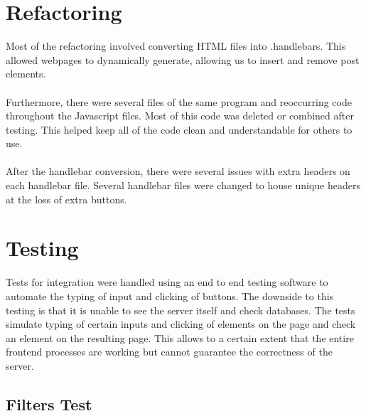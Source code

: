 \documentclass[a4paper]{article}
\begin{document}
\section{Refactoring}
Most of the refactoring involved converting HTML files into .handlebars. This allowed webpages to dynamically generate, allowing us to insert and remove post elements. \\
\\
Furthermore, there were several files of the same program and reoccurring code throughout the Javascript files. Most of this code was deleted or combined after testing. This helped keep all of the code clean and understandable for others to use.\\
\\
After the handlebar conversion, there were several issues with extra headers on each handlebar file. Several handlebar files were changed to house unique headers at the loss of extra buttons. 


\section{Testing}

Tests for integration were handled using an end to end testing software to automate the typing of input and clicking of buttons. 
The downside to this testing is that it is unable to see the server itself and check databases.
The tests simulate typing of certain inputs and clicking of elements on the page and check an element on the resulting page.
This allows to a certain extent that the entire frontend processes are working but cannot guarantee the correctness of the server.

\subsection{Filters Test}
\end{document}
